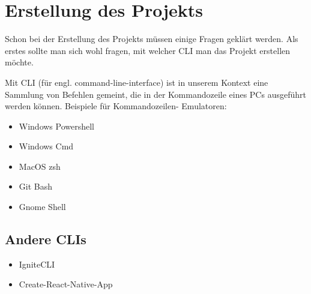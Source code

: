 \chapter{Erstellung des Projekts}
Schon bei der Erstellung des Projekts müssen einige Fragen geklärt werden. Als erstes sollte man
sich wohl fragen, mit welcher CLI man das Projekt erstellen möchte.

Mit CLI (für engl. command-line-interface) ist in unserem Kontext eine Sammlung von Befehlen
gemeint, die in der Kommandozeile eines PCs ausgeführt werden können. Beispiele für Kommandozeilen-
Emulatoren:

\begin{itemize}
  \item Windows Powershell
  \item Windows Cmd
  \item MacOS zsh
  \item Git Bash
  \item Gnome Shell
\end{itemize}




\section{Andere CLIs}
\begin{itemize}
  \item IgniteCLI \cite{ignitecli}
  \item Create-React-Native-App \cite{createReactNativeApp}
\end{itemize}